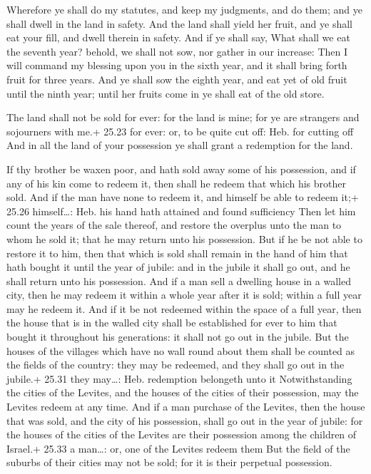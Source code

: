  Wherefore ye shall do my statutes, and keep my
judgments, and do them; and ye shall dwell in the land in safety.
 And the land shall yield her fruit, and ye shall eat your
fill, and dwell therein in safety.  And if ye shall say,
What shall we eat the seventh year? behold, we shall not sow, nor gather
in our increase:  Then I will command my blessing upon you
in the sixth year, and it shall bring forth fruit for three years.
 And ye shall sow the eighth year, and eat yet of old fruit
until the ninth year; until her fruits come in ye shall eat of the old
store.

 The land shall not be sold for ever: for the land is
mine; for ye are strangers and sojourners with me.+ 25.23 for ever: or,
to be quite cut off: Heb. for cutting off  And in all the
land of your possession ye shall grant a redemption for the land.

 If thy brother be waxen poor, and hath sold away some of
his possession, and if any of his kin come to redeem it, then shall he
redeem that which his brother sold.  And if the man have
none to redeem it, and himself be able to redeem it;+ 25.26
himself\ldots: Heb. his hand hath attained and found sufficiency
 Then let him count the years of the sale thereof, and
restore the overplus unto the man to whom he sold it; that he may return
unto his possession.  But if he be not able to restore it
to him, then that which is sold shall remain in the hand of him that
hath bought it until the year of jubile: and in the jubile it shall go
out, and he shall return unto his possession.  And if a man
sell a dwelling house in a walled city, then he may redeem it within a
whole year after it is sold; within a full year may he redeem it.
 And if it be not redeemed within the space of a full year,
then the house that is in the walled city shall be established for ever
to him that bought it throughout his generations: it shall not go out in
the jubile.  But the houses of the villages which have no
wall round about them shall be counted as the fields of the country:
they may be redeemed, and they shall go out in the jubile.+ 25.31 they
may\ldots: Heb. redemption belongeth unto it 
Notwithstanding the cities of the Levites, and the houses of the cities
of their possession, may the Levites redeem at any time. 
And if a man purchase of the Levites, then the house that was sold, and
the city of his possession, shall go out in the year of jubile: for the
houses of the cities of the Levites are their possession among the
children of Israel.+ 25.33 a man\ldots: or, one of the Levites redeem
them  But the field of the suburbs of their cities may not
be sold; for it is their perpetual possession.

